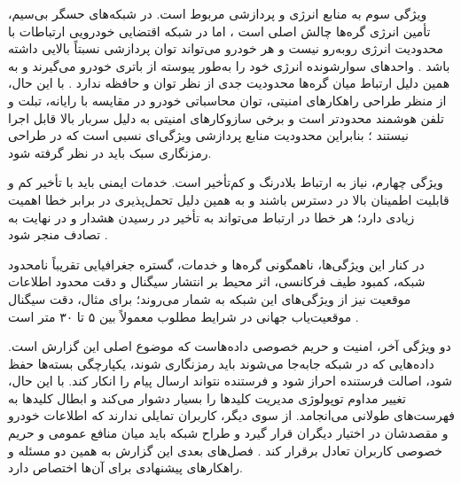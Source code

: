 ویژگی سوم به منابع انرژی و پردازشی مربوط است. در شبکه‌های حسگر بی‌سیم، تأمین انرژی گره‌ها چالش اصلی است \cite{hozouriOverviewVANETVehicular2023}، اما در شبکه اقتضایی خودرویی ارتباطات با محدودیت انرژی روبه‌رو نیست و هر خودرو می‌تواند توان پردازشی نسبتاً بالایی داشته باشد \cite{luConnectedVehiclesSolutions2014}. واحدهای سوارشونده انرژی خود را به‌طور پیوسته از باتری خودرو می‌گیرند و به همین دلیل ارتباط میان گره‌ها محدودیت جدی از نظر توان و حافظه ندارد \cite{hozouriOverviewVANETVehicular2023}. با این حال، از منظر طراحی راهکارهای امنیتی، توان محاسباتی خودرو در مقایسه با رایانه، تبلت و تلفن هوشمند محدودتر است و برخی سازوکارهای امنیتی به دلیل سربار بالا قابل اجرا نیستند \cite{farsimadanReviewSecurityChallenges2025}؛ بنابراین محدودیت منابع پردازشی ویژگی‌ای نسبی است که در طراحی رمزنگاری سبک باید در نظر گرفته شود.

ویژگی چهارم، نیاز به ارتباط بلادرنگ و کم‌تأخیر است. خدمات ایمنی باید با تأخیر کم و قابلیت اطمینان بالا در دسترس باشند \cite{hozouriOverviewVANETVehicular2023,luConnectedVehiclesSolutions2014} و به همین دلیل تحمل‌پذیری در برابر خطا اهمیت زیادی دارد؛ هر خطا در ارتباط می‌تواند به تأخیر در رسیدن هشدار و در نهایت به تصادف منجر شود \cite{hozouriOverviewVANETVehicular2023}.

در کنار این ویژگی‌ها، ناهمگونی گره‌ها و خدمات، گستره جغرافیایی تقریباً نامحدود شبکه، کمبود طیف فرکانسی، اثر محیط بر انتشار سیگنال و دقت محدود اطلاعات موقعیت نیز از ویژگی‌های این شبکه به شمار می‌روند؛ برای مثال، دقت سیگنال موقعیت‌یاب جهانی در شرایط مطلوب معمولاً بین ۵ تا ۳۰ متر است \cite{hozouriOverviewVANETVehicular2023}.

دو ویژگی آخر، امنیت و حریم خصوصی داده‌هاست که موضوع اصلی این گزارش است. داده‌هایی که در شبکه جابه‌جا می‌شوند باید رمزنگاری شوند، یکپارچگی بسته‌ها حفظ شود، اصالت فرستنده احراز شود و فرستنده نتواند ارسال پیام را انکار کند. با این حال، تغییر مداوم توپولوژی مدیریت کلیدها را بسیار دشوار می‌کند و ابطال کلیدها به فهرست‌های طولانی می‌انجامد. از سوی دیگر، کاربران تمایلی ندارند که اطلاعات خودرو و مقصدشان در اختیار دیگران قرار گیرد و طراح شبکه باید میان منافع عمومی و حریم خصوصی کاربران تعادل برقرار کند \cite{hozouriOverviewVANETVehicular2023}. فصل‌های بعدی این گزارش به همین دو مسئله و راهکارهای پیشنهادی برای آن‌ها اختصاص دارد.
